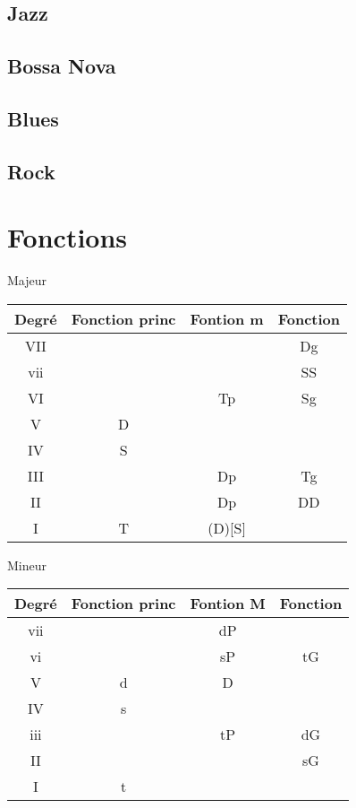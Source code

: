 \documentclass[a4paper,10pt]{article}
\begin{document}
\subsection{Jazz}
\subsection{Bossa Nova}
\subsection{Blues}
\subsection{Rock}

\appendix
\large
\section{Fonctions}
Majeur

\begin{tabular}{ | c | c | c | c | } \hline			
	Degré & Fonction princ & Fontion m & Fonction \\ \hline  
	VII & & & Dg \\ \hline
	vii & & & SS \\ \hline
	VI & & Tp & Sg \\ \hline
	V & D & & \\ \hline
	IV & S & & \\ \hline
	III & & Dp & Tg \\ \hline
	II & & Dp & DD \\ \hline
	I & T & (D)[S] & \\ \hline
\end{tabular}
\newline
\newline

Mineur

\begin{tabular}{ | c | c | c | c | } \hline			
	Degré & Fonction princ & Fontion M & Fonction \\ \hline  
	vii & & dP & \\ \hline
	vi & & sP & tG \\ \hline
	V & d & D & \\ \hline
	IV & s & & \\ \hline
	iii & & tP & dG \\ \hline
	II & & & sG \\ \hline
	I & t & & \\ \hline
\end{tabular}
\end{document}
